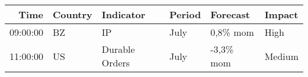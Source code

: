 \documentclass[11pt]{article}
\date{\today}
\title{}
\begin{document}
\tableofcontents

\begin{center}
\begin{tabular}{rlllll}
\textbf{Time} & \textbf{Country} & \textbf{Indicator} & \textbf{Period} & \textbf{Forecast} & \textbf{Impact}\\
\hline
09:00:00 & BZ & IP & July & 0,8\% mom & High\\
11:00:00 & US & Durable Orders & July & -3,3\% mom & Medium\\
\end{tabular}
\end{center}
\end{document}
